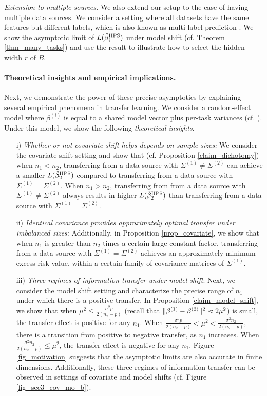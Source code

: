 \noindent\textit{Extension to multiple sources.}
We also extend our setup to the case of having multiple data sources.
We consider a setting where all datasets have the same features but different labels, which is also known as multi-label prediction \cite{hsu2009multi}.
We show the asymptotic limit of $L(\hat{\beta}_i^{\textup{HPS}})$ under model shift (cf. Theorem \ref{thm_many_tasks}) and use the result to illustrate how to select the hidden width $r$ of $B$.

\paragraph{Theoretical insights and empirical implications.} Next, we demonstrate the power of these precise asymptotics by explaining several empirical phenomena in transfer learning.
We consider a random-effect model where $\beta^{(i)}$ is equal to a shared model vector plus per-task variances (cf. \citet{dobriban2018high}).
Under this model, we show the following \textit{theoretical insights}.
\begin{enumerate}
    \item[i)] \textit{Whether or not covariate shift helps depends on sample sizes:} We consider the covariate shift setting and show that (cf. Proposition \ref{claim_dichotomy}) when $n_1 < n_2$, transferring from a data source with $\Sigma^{(1)} \neq \Sigma^{(2)}$ can achieve a smaller $L(\hat{\beta}_2^{\textup{HPS}})$ compared to transferring from a data source with $\Sigma^{(1)} = \Sigma^{(2)}$. When $n_1 > n_2$, transferring from from a data source with $\Sigma^{(1)} \neq \Sigma^{(2)}$ always results in higher $L(\hat{\beta}_2^{\textup{HPS}})$ than transferring from a data source with $\Sigma^{(1)} = \Sigma^{(2)}$.
    \item[ii)] \textit{Identical covariance provides approximately optimal transfer under imbalanced sizes:} Additionally, in Proposition \ref{prop_covariate}, we show that when $n_1$ is greater than $n_2$ times a certain large constant factor, transferring from a data source with $\Sigma^{(1)} = \Sigma^{(2)}$ achieves an approximately minimum excess risk value, within a certain family of covariance matrices of $\Sigma^{(1)}$.
    \item[iii)] \textit{Three regimes of information transfer under model shift}: Next, we consider the model shift setting and characterize the precise range of $n_1$ under which there is a positive transfer.
    In Proposition \ref{claim_model_shift}, we show that when $\mu^2 \le \frac{\sigma^2 p}{2(n_2 - p)}$ (recall that $\|\beta^{(1)} - \beta^{(2)}\|^2 \approx 2\mu^2$) is small, the transfer effect is positive for any $n_1$.
    When $\frac{\sigma^2 p}{2(n_2 - p)} < \mu^2 < \frac{\sigma^2 n_2}{2(n_2 - p)}$, there is a transition from positive to negative transfer, as $n_1$ increases.
    When $\frac{\sigma^2 n_2}{2(n_2 - p)} \le \mu^2$, the transfer effect is negative for any $n_1$.
    Figure \ref{fig_motivation} suggests that the asymptotic limits are also accurate in finite dimensions.
    Additionally, these three regimes of information transfer can be observed in settings of covariate and model shifts (cf. Figure \ref{fig_sec3_cov_mo_b}).
\end{enumerate}

